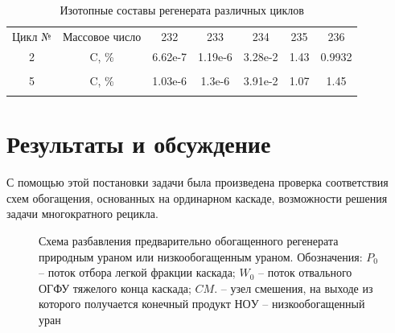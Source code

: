 \begin{table}[h]
  \centering
  \normalsize\begin{tabulary}{1.0\textwidth}{CCCCCCC}
  Цикл № & Массовое число & 232 & 233 & 234 & 235 & 236 \\
  2 & C, \% & 6.62e-7 & 1.19e-6 &    3.28e-2 & 1.43 & 0.9932 \\
   &  &  &  &  &  &  \\
  5 & C, \% &  1.03e-6 &   1.3e-6 &  3.91e-2 & 1.07 & 1.45 \\
   &  &  &  &  &  &  \\
  \end{tabulary}
  \caption{{Изотопные составы регенерата различных циклов{\label{is_compositions_2_5}}}}
\end{table}

\section{Результаты и обсуждение}

С помощью этой постановки задачи была произведена проверка соответствия схем обогащения, основанных на ординарном каскаде, возможности решения задачи многократного рецикла.

\begin{figure}[ht]
  \caption{Схема разбавления предварительно обогащенного регенерата природным ураном или низкообогащенным ураном. Обозначения: $P_0$ -- поток отбора легкой фракции каскада; $W_0$ -- поток отвального ОГФУ тяжелого конца каскада; $CM.$ -- узел смешения, на выходе из которого получается конечный продукт $НОУ$ -- низкообогащенный уран}\label{o1}
\end{figure}

